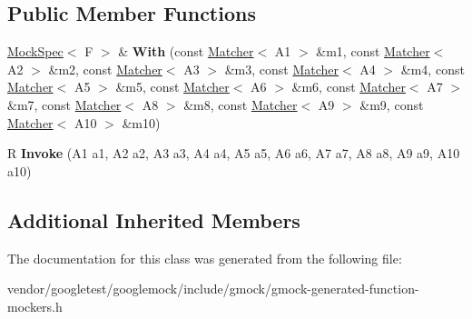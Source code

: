 \subsection*{Public Member Functions}
\begin{DoxyCompactItemize}
\item 
\hyperlink{classtesting_1_1internal_1_1MockSpec}{Mock\+Spec}$<$ F $>$ \& {\bfseries With} (const \hyperlink{classtesting_1_1Matcher}{Matcher}$<$ A1 $>$ \&m1, const \hyperlink{classtesting_1_1Matcher}{Matcher}$<$ A2 $>$ \&m2, const \hyperlink{classtesting_1_1Matcher}{Matcher}$<$ A3 $>$ \&m3, const \hyperlink{classtesting_1_1Matcher}{Matcher}$<$ A4 $>$ \&m4, const \hyperlink{classtesting_1_1Matcher}{Matcher}$<$ A5 $>$ \&m5, const \hyperlink{classtesting_1_1Matcher}{Matcher}$<$ A6 $>$ \&m6, const \hyperlink{classtesting_1_1Matcher}{Matcher}$<$ A7 $>$ \&m7, const \hyperlink{classtesting_1_1Matcher}{Matcher}$<$ A8 $>$ \&m8, const \hyperlink{classtesting_1_1Matcher}{Matcher}$<$ A9 $>$ \&m9, const \hyperlink{classtesting_1_1Matcher}{Matcher}$<$ A10 $>$ \&m10)\hypertarget{classtesting_1_1internal_1_1FunctionMocker_3_01R_07A1_00_01A2_00_01A3_00_01A4_00_01A5_00_01A6_0079295c90ba14a714e84d5a856a5b50dd_a30238afadc5c348acff39f601fadc786}{}\label{classtesting_1_1internal_1_1FunctionMocker_3_01R_07A1_00_01A2_00_01A3_00_01A4_00_01A5_00_01A6_0079295c90ba14a714e84d5a856a5b50dd_a30238afadc5c348acff39f601fadc786}

\item 
R {\bfseries Invoke} (A1 a1, A2 a2, A3 a3, A4 a4, A5 a5, A6 a6, A7 a7, A8 a8, A9 a9, A10 a10)\hypertarget{classtesting_1_1internal_1_1FunctionMocker_3_01R_07A1_00_01A2_00_01A3_00_01A4_00_01A5_00_01A6_0079295c90ba14a714e84d5a856a5b50dd_a5ddc0163e96a8c644059f562dfa2cd4b}{}\label{classtesting_1_1internal_1_1FunctionMocker_3_01R_07A1_00_01A2_00_01A3_00_01A4_00_01A5_00_01A6_0079295c90ba14a714e84d5a856a5b50dd_a5ddc0163e96a8c644059f562dfa2cd4b}

\end{DoxyCompactItemize}
\subsection*{Additional Inherited Members}


The documentation for this class was generated from the following file\+:\begin{DoxyCompactItemize}
\item 
vendor/googletest/googlemock/include/gmock/gmock-\/generated-\/function-\/mockers.\+h\end{DoxyCompactItemize}
